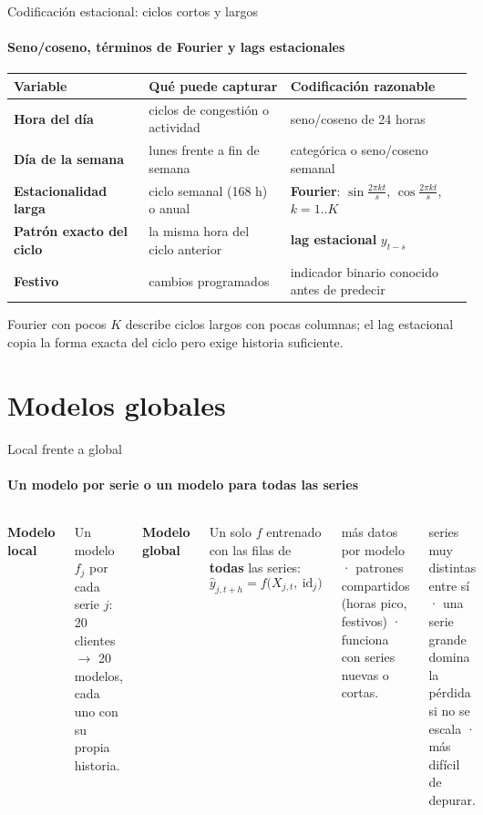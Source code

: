 \documentclass[aspectratio=169,11pt]{beamer}  %
\newcommand{\hrow}{\rowcolor{mlcream}}
\newcommand{\colhead}[1]{\textbf{#1}\par\vspace{2pt}}
\begin{document}
\begin{frame}{Codificación estacional: ciclos cortos y largos}
\framesubtitle{Seno/coseno, términos de Fourier y lags estacionales}
\centering\footnotesize
\begin{tabular}{@{}l P{0.30\textwidth} P{0.36\textwidth}@{}}
\toprule
\hrow \textbf{Variable} & Qué puede capturar & Codificación razonable\\
\midrule
\textbf{Hora del día} & ciclos de congestión o actividad & seno/coseno de 24 horas\\
\textbf{Día de la semana} & lunes frente a fin de semana & categórica o seno/coseno semanal\\
\textbf{Estacionalidad larga} & ciclo semanal (168 h) o anual & \textbf{Fourier}: $\sin\frac{2\pi k t}{s}$, $\cos\frac{2\pi k t}{s}$, $k = 1..K$\\
\textbf{Patrón exacto del ciclo} & la misma hora del ciclo anterior & \textbf{lag estacional} $y_{t-s}$\\
\textbf{Festivo} & cambios programados & indicador binario conocido antes de predecir\\
\bottomrule
\end{tabular}
\raggedright
\begin{keybox}
\small Fourier con pocos $K$ describe ciclos largos con pocas columnas; el lag estacional copia la forma exacta del ciclo pero exige historia suficiente.
\end{keybox}
\end{frame}

\section{Modelos globales}

\begin{frame}{Local frente a global}
\framesubtitle{Un modelo por serie o un modelo para todas las series}
\begin{columns}[T]
\colhead{Modelo local}
\small Un modelo $f_j$ por cada serie $j$: 20 clientes $\rightarrow$ 20 modelos, cada uno con su propia historia.
\vspace{6pt}

\colhead{Modelo global}
\small Un solo $f$ entrenado con las filas de \textbf{todas} las series:
\[ \hat y_{j,t+h} = f\big(X_{j,t},\ \text{id}_j\big) \]
\begin{goldbox}
\small más datos por modelo · patrones compartidos (horas pico, festivos) · funciona con series nuevas o cortas.
\end{goldbox}
\begin{rulebox}
\small series muy distintas entre sí · una serie grande domina la pérdida si no se escala · más difícil de depurar.
\end{rulebox}
\end{columns}
\end{frame}
\end{document}
